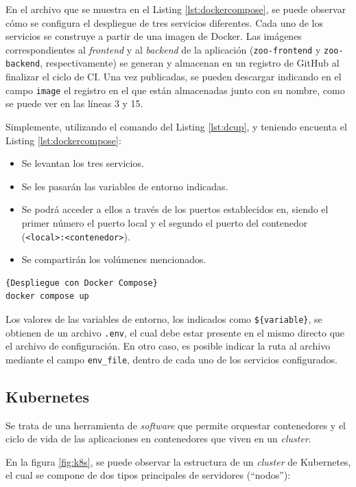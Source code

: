 En el archivo que se muestra en el Listing \ref{lst:dockercompose}, se puede observar cómo se configura el despliegue de tres servicios diferentes. Cada uno de los servicios se construye a partir de una imagen de Docker. Las imágenes correspondientes al \textit{frontend} y al \textit{backend} de la aplicación (\texttt{zoo-frontend} y \texttt{zoo-backend}, respectivamente) se generan y almacenan en un registro de GitHub al finalizar el ciclo de CI. Una vez publicadas, se pueden descargar indicando en el campo \texttt{image} el registro en el que están almacenadas junto con su nombre, como se puede ver en las líneas 3 y 15.

Simplemente, utilizando el comando del Listing \ref{lst:dcup}, y teniendo encuenta el Listing \ref{lst:dockercompose}:

\begin{itemize}
  \item Se levantan los tres servicios.
  \item Se les pasarán las variables de entorno indicadas.
  \item Se podrá acceder a ellos a través de los puertos establecidos en, siendo el primer número el puerto local y el segundo el puerto del contenedor (\texttt{<local>:<contenedor>}).
  \item Se compartirán los volúmenes mencionados.
\end{itemize}

\begin{lstlisting}[language=bash,label=lst:dcup]{Despliegue con Docker Compose}
docker compose up
\end{lstlisting}

Los valores de las variables de entorno, los indicados como \texttt{\$\{variable\}}, se obtienen de un archivo \texttt{.env}, el cual debe estar presente en el mismo directo que el archivo de configuración. En otro caso, es posible indicar la ruta al archivo mediante el campo \texttt{env\_file}, dentro de cada uno de los servicios configurados.

\subsection*{Kubernetes}
\label{tech:k8s}

Se trata de una herramienta de \textit{software} que permite orquestar contenedores y el ciclo de vida de las aplicaciones en contenedores que viven en un \textit{cluster}.

En la figura \ref{fig:k8s}, se puede observar la estructura de un \textit{cluster} de Kubernetes, el cual se compone de dos tipos principales de servidores (``nodos''):

